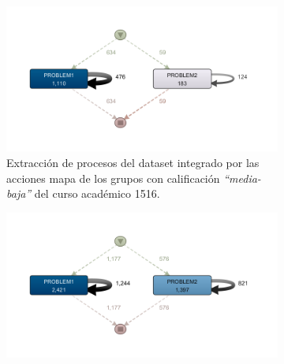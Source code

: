 \begin{figure}[H]
  \begin{subfigure}[t]{0.60\textwidth}
    \includegraphics[width=1.10\textwidth, height=0.80\textwidth]{imagenes/DISCO_map/Dataset FusionadoYear1516MidLowGrades.png}
    \caption{Extracción de procesos del dataset integrado por las acciones mapa de los grupos con calificación \emph{``media-baja''} del curso académico 1516.}
    \label{fig:mapYear1516MidLowGrades}
  \end{subfigure}
  \hfill
  \begin{subfigure}[t]{0.60\textwidth}
    \includegraphics[width=1.10\textwidth, height=0.80\textwidth]{imagenes/DISCO_map/Dataset FusionadoYear1718MidLowGrades.png}

\end{subfigure}
\end{figure}
